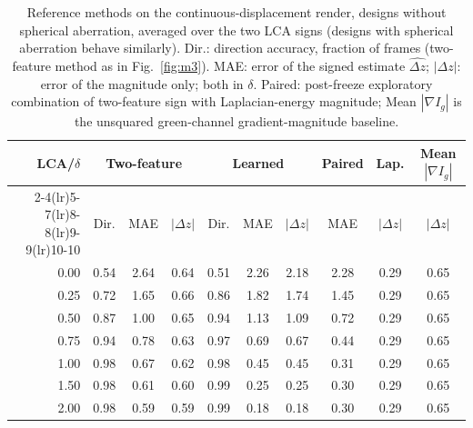 \begin{table}[t]\centering\footnotesize
\caption{Reference methods on the continuous-displacement render, designs without spherical aberration, averaged over the two LCA signs (designs with spherical aberration behave similarly). Dir.: direction accuracy, fraction of frames (two-feature method as in Fig.~\ref{fig:m3}). MAE: error of the signed estimate $\widehat{\Delta z}$; $|\Delta z|$: error of the magnitude only; both in $\delta$. Paired: post-freeze exploratory combination of two-feature sign with Laplacian-energy magnitude; Mean $|\nabla I_g|$ is the unsquared green-channel gradient-magnitude baseline.}
\label{tab:ref}\setlength{\tabcolsep}{1.8pt}
\begin{tabular}{rccccccccc}\toprule
LCA/$\delta$ & \multicolumn{3}{c}{Two-feature} & \multicolumn{3}{c}{Learned} & Paired & Lap. & Mean $|\nabla I_g|$ \\
\cmidrule(lr){2-4}\cmidrule(lr){5-7}\cmidrule(lr){8-8}\cmidrule(lr){9-9}\cmidrule(lr){10-10}
 & Dir. & MAE & $|\Delta z|$ & Dir. & MAE & $|\Delta z|$ & MAE & $|\Delta z|$ & $|\Delta z|$ \\\midrule
0.00 & 0.54 & 2.64 & 0.64 & 0.51 & 2.26 & 2.18 & 2.28 & 0.29 & 0.65 \\
0.25 & 0.72 & 1.65 & 0.66 & 0.86 & 1.82 & 1.74 & 1.45 & 0.29 & 0.65 \\
0.50 & 0.87 & 1.00 & 0.65 & 0.94 & 1.13 & 1.09 & 0.72 & 0.29 & 0.65 \\
0.75 & 0.94 & 0.78 & 0.63 & 0.97 & 0.69 & 0.67 & 0.44 & 0.29 & 0.65 \\
1.00 & 0.98 & 0.67 & 0.62 & 0.98 & 0.45 & 0.45 & 0.31 & 0.29 & 0.65 \\
1.50 & 0.98 & 0.61 & 0.60 & 0.99 & 0.25 & 0.25 & 0.30 & 0.29 & 0.65 \\
2.00 & 0.98 & 0.59 & 0.59 & 0.99 & 0.18 & 0.18 & 0.30 & 0.29 & 0.65 \\
\bottomrule\end{tabular}\end{table}
